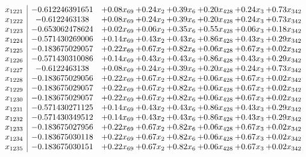 \documentclass[8pt]{article}
\begin{document}
\[\begin{array}{c| c c@{\hskip 2pt} c@{\hskip 2pt} c@{\hskip 2pt} c@{\hskip 2pt} c@{\hskip 2pt} c@{\hskip 2pt} }
 x_{1221}   &  -0.612246391651 & +  0.08 x_{69} & +  0.24 x_{2} & +  0.39 x_{6} & +  0.20 x_{428} & +  0.24 x_{3} & +  0.73 x_{342}\\
 x_{1222}   &  -0.6122463138 & +  0.08 x_{69} & +  0.24 x_{2} & +  0.39 x_{6} & +  0.20 x_{428} & +  0.24 x_{3} & +  0.73 x_{342}\\
 x_{1223}   &  -0.653062478624 & +  0.02 x_{69} & +  0.06 x_{2} & +  0.35 x_{6} & +  0.55 x_{428} & +  0.06 x_{3} & +  0.18 x_{342}\\
 x_{1224}   &  -0.571430269006 & +  0.14 x_{69} & +  0.43 x_{2} & +  0.43 x_{6} & +  0.86 x_{428} & +  0.43 x_{3} & +  0.29 x_{342}\\
 x_{1225}   &  -0.183675029057 & +  0.22 x_{69} & +  0.67 x_{2} & +  0.82 x_{6} & +  0.06 x_{428} & +  0.67 x_{3} & +  0.02 x_{342}\\
 x_{1226}   &  -0.571430310086 & +  0.14 x_{69} & +  0.43 x_{2} & +  0.43 x_{6} & +  0.86 x_{428} & +  0.43 x_{3} & +  0.29 x_{342}\\
 x_{1227}   &  -0.6122463138 & +  0.08 x_{69} & +  0.24 x_{2} & +  0.39 x_{6} & +  0.20 x_{428} & +  0.24 x_{3} & +  0.73 x_{342}\\
 x_{1228}   &  -0.183675029056 & +  0.22 x_{69} & +  0.67 x_{2} & +  0.82 x_{6} & +  0.06 x_{428} & +  0.67 x_{3} & +  0.02 x_{342}\\
 x_{1229}   &  -0.183675029057 & +  0.22 x_{69} & +  0.67 x_{2} & +  0.82 x_{6} & +  0.06 x_{428} & +  0.67 x_{3} & +  0.02 x_{342}\\
 x_{1230}   &  -0.183675029057 & +  0.22 x_{69} & +  0.67 x_{2} & +  0.82 x_{6} & +  0.06 x_{428} & +  0.67 x_{3} & +  0.02 x_{342}\\
 x_{1231}   &  -0.571430271125 & +  0.14 x_{69} & +  0.43 x_{2} & +  0.43 x_{6} & +  0.86 x_{428} & +  0.43 x_{3} & +  0.29 x_{342}\\
 x_{1232}   &  -0.571430349512 & +  0.14 x_{69} & +  0.43 x_{2} & +  0.43 x_{6} & +  0.86 x_{428} & +  0.43 x_{3} & +  0.29 x_{342}\\
 x_{1233}   &  -0.183675027956 & +  0.22 x_{69} & +  0.67 x_{2} & +  0.82 x_{6} & +  0.06 x_{428} & +  0.67 x_{3} & +  0.02 x_{342}\\
 x_{1234}   &  -0.183675030118 & +  0.22 x_{69} & +  0.67 x_{2} & +  0.82 x_{6} & +  0.06 x_{428} & +  0.67 x_{3} & +  0.02 x_{342}\\
 x_{1235}   &  -0.183675030151 & +  0.22 x_{69} & +  0.67 x_{2} & +  0.82 x_{6} & +  0.06 x_{428} & +  0.67 x_{3} & +  0.02 x_{342}\\

\end{array}\]
\end{document}
